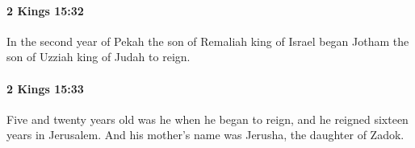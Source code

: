 		\paragraph{2 Kings 15:32} %
			\label{2KINGS-15-32}

			In the second year of Pekah the son of Remaliah king of Israel began Jotham the son of Uzziah king of Judah to reign.


		\paragraph{2 Kings 15:33} %
			\label{2KINGS-15-33}

			Five and twenty years old was he when he began to reign, and he reigned sixteen years in Jerusalem. And his mother’s name was Jerusha, the daughter of Zadok.


